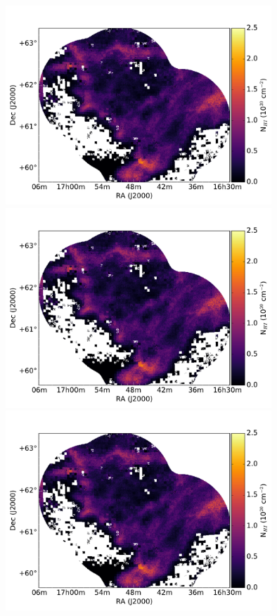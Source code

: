 \documentclass[traditabstract]{aa}
\begin{document}
\begin{figure}[h]
  \centering
  \includegraphics[page=1,height=7.5cm,trim=110 35 105 75,clip=true]{Figures/DHIGLS_NHI.pdf}
  \hspace{5mm}
  \includegraphics[page=4,height=7.5cm,trim=110 35 105 75,clip=true]{Figures/DHIGLS_NHI.pdf} \\
  \vspace{5mm}
  \includegraphics[page=2,height=7.5cm,trim=110 35 105 75,clip=true]{Figures/DHIGLS_NHI.pdf}

\end{figure}
\end{document}
